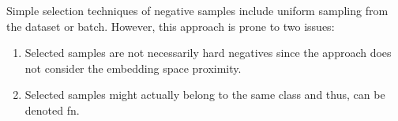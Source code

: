 Simple selection techniques of negative samples include uniform sampling from the dataset or batch.
However, this approach is prone to two issues:
\begin{enumerate}
    \item Selected samples are not necessarily hard negatives since the approach does not consider the embedding space proximity.
    \item Selected samples might actually belong to the same class and thus, can be denoted \ac{fn}.
\end{enumerate}


